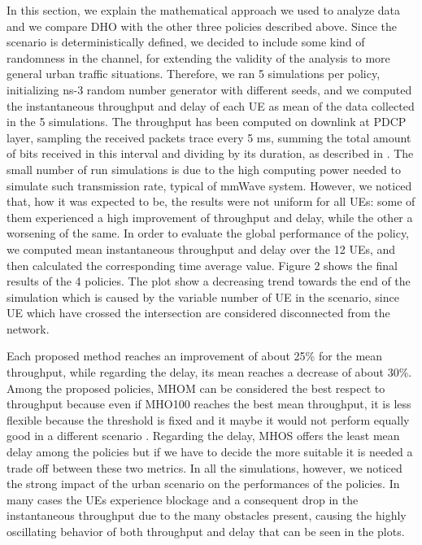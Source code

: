 \documentclass[conference,10pt]{IEEEtran}
\begin{document}
In this section, we explain the mathematical approach we used to analyze data and we compare DHO with the other three policies described above.
Since the scenario is deterministically defined, we decided to include some kind of randomness in the channel, for extending the validity of the analysis to more general urban traffic situations. Therefore, we ran 5 simulations per policy, initializing ns-3 random number generator with different seeds, and we computed the instantaneous throughput and delay of each UE as mean of the data collected in the 5 simulations. The throughput has been computed on downlink at PDCP layer, sampling the received packets trace every 5 ms, summing the total amount of bits received in this interval and dividing by its duration, as described in \cite{imphand}. 
The small number of run simulations is due to the high computing power needed to simulate such transmission rate, typical of mmWave system. However, we noticed that, how it was expected to be, the results were not uniform for all UEs: some of them experienced a high improvement of throughput and delay, while the other a worsening of the same. In order to evaluate the global performance of the policy, we computed mean instantaneous throughput and delay over the 12 UEs, and then calculated the corresponding time average value.
Figure 2 shows the final results of the 4 policies. The plot show a decreasing trend towards the end of the simulation which is caused by the variable number of UE in the scenario, since UE which have crossed the intersection are considered disconnected from the network.

Each proposed method reaches an improvement of about 25\% for the mean throughput, while regarding the delay, its mean reaches a decrease of about 30\%. Among the proposed policies, MHOM can be considered the best respect to throughput because even if MHO100 reaches the best mean throughput, it is less flexible because the threshold is fixed and it maybe it would not perform equally good in a different scenario . Regarding the delay, MHOS offers the least mean delay among the policies but if we have to decide the more suitable it is needed a trade off between these two metrics. In all the simulations, however, we noticed the strong impact of the urban scenario on the performances of the policies. In many cases the UEs experience blockage and a consequent drop in the instantaneous throughput due to the many obstacles present, causing the highly oscillating behavior of both throughput and delay that can be seen in the plots.
\end{document}
